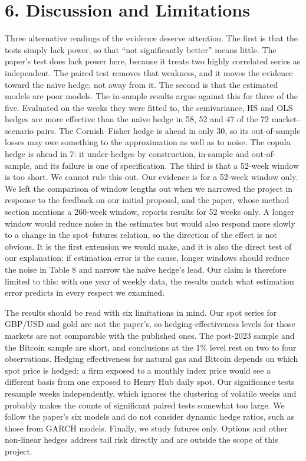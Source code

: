 \documentclass[11pt,letterpaper]{article}
\begin{document}
\section*{6. Discussion and Limitations}

Three alternative readings of the evidence deserve attention. The first is that the tests simply lack power, so that “not significantly better” means little. The paper's test does lack power here, because it treats two highly correlated series as independent. The paired test removes that weakness, and it moves the evidence toward the naïve hedge, not away from it. The second is that the estimated models are poor models. The in-sample results argue against this for three of the five. Evaluated on the weeks they were fitted to, the semivariance, HS and OLS hedges are more effective than the naïve hedge in 58, 52 and 47 of the 72 market–scenario pairs. The Cornish–Fisher hedge is ahead in only 30, so its out-of-sample losses may owe something to the approximation as well as to noise. The copula hedge is ahead in 7: it under-hedges by construction, in-sample and out-of-sample, and its failure is one of specification. The third is that a 52-week window is too short. We cannot rule this out. Our evidence is for a 52-week window only. We left the comparison of window lengths out when we narrowed the project in response to the feedback on our initial proposal, and the paper, whose method section mentions a 260-week window, reports results for 52 weeks only. A longer window would reduce noise in the estimates but would also respond more slowly to a change in the spot–futures relation, so the direction of the effect is not obvious. It is the first extension we would make, and it is also the direct test of our explanation: if estimation error is the cause, longer windows should reduce the noise in Table 8 and narrow the naïve hedge's lead. Our claim is therefore limited to this: with one year of weekly data, the results match what estimation error predicts in every respect we examined.

The results should be read with six limitations in mind. Our spot series for GBP/USD and gold are not the paper's, so hedging-effectiveness levels for those markets are not comparable with the published ones. The post-2023 sample and the Bitcoin sample are short, and conclusions at the 1\% level rest on two to four observations. Hedging effectiveness for natural gas and Bitcoin depends on which spot price is hedged; a firm exposed to a monthly index price would see a different basis from one exposed to Henry Hub daily spot. Our significance tests resample weeks independently, which ignores the clustering of volatile weeks and probably makes the counts of significant paired tests somewhat too large. We follow the paper's six models and do not consider dynamic hedge ratios, such as those from GARCH models. Finally, we study futures only. Options and other non-linear hedges address tail risk directly and are outside the scope of this project.
\end{document}
